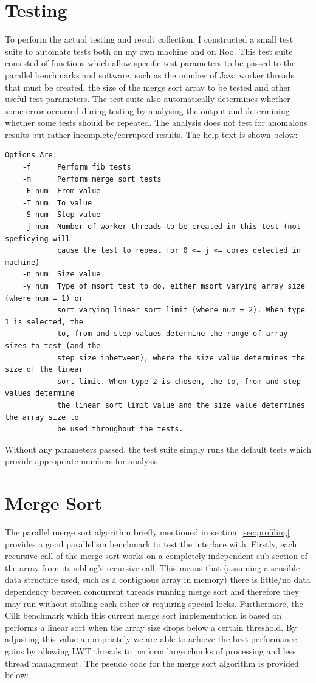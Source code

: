 \documentclass[12pt,twoside,notitlepage]{report}
\begin{document}
\section{Testing}
\label{sec:testing}
To perform the actual testing and result collection, I constructed a small test suite to automate tests both on my own machine and on Roo. This test suite consisted of functions which allow specific test parameters to be passed to the
parallel benchmarks and software, such as the number of Java worker threads that must be created, the size of the merge sort array to be tested and other useful test parameters. The test suite also automatically determines whether
some error occurred during testing by analysing the output and determining whether some tests should be repeated. The analysis does not test for anomalous results but rather incomplete/corrupted results. The help text is shown below:
\begin{lstlisting}[keywordstyle=\color{black}]
Options Are:
    -f      Perform fib tests
    -m      Perform merge sort tests
    -F num  From value
    -T num  To value
    -S num  Step value
    -j num  Number of worker threads to be created in this test (not speficying will
            cause the test to repeat for 0 <= j <= cores detected in machine)
    -n num  Size value
    -y num  Type of msort test to do, either msort varying array size (where num = 1) or
            sort varying linear sort limit (where num = 2). When type 1 is selected, the
            to, from and step values determine the range of array sizes to test (and the
            step size inbetween), where the size value determines the size of the linear
            sort limit. When type 2 is chosen, the to, from and step values determine
            the linear sort limit value and the size value determines the array size to 
            be used throughout the tests.
\end{lstlisting}
Without any parameters passed, the test suite simply runs the default tests which provide appropriate numbers for analysis.


\section{Merge Sort}
\label{sec:merge_sort}
The parallel merge sort algorithm briefly mentioned in section~\ref{sec:profiling} provides a good parallelism benchmark to test the interface with. Firstly, each recursive call of the merge sort works on a completely independent sub
section of the array from its sibling's recursive call. This means that (assuming a sensible data structure used, such as a contiguous array in memory) there is little/no data dependency between concurrent threads running merge sort
and therefore they may run without stalling each other or requiring special locks. Furthermore, the Cilk benchmark which this current merge sort implementation is based on performs a linear sort when the array size drops below a
certain threshold. By adjusting this value appropriately we are able to achieve the best performance gains by allowing LWT threads to perform large chunks of processing and less thread management. The pseudo code for the merge sort
algorithm is provided below:
\end{document}
